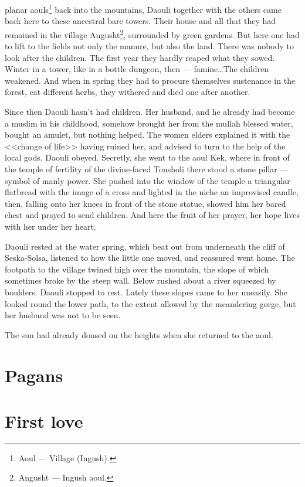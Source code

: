 \documentclass[smalldemyvopaper,11pt,twoside,onecolumn,openright,extrafontsizes]{memoir}
\begin{document}
planar aouls\footnote{Aoul — Village (Ingush).} back into the mountains, Daouli together with the others came back
here to these ancestral bare towers. Their house and all that they had remained
in the village Angusht\footnote{Angusht — Ingush aoul.}, surrounded by green gardens. But here one had to lift
to the fields not only the manure, but also the land. There was nobody to look
after the children. The first year they hardly reaped what they sowed. Winter
in a tower, like in a bottle dungeon, then --- famine\dots The children
weakened. And when in spring they had to procure themselves sustenance in the
forest, eat different herbs, they withered and died one after another.\par
Since then Daouli hasn't had children. Her husband, and he already had become
a muslim in his childhood, somehow brought her from the mullah blessed
water, bought an amulet, but nothing helped. The women elders explained it with
the <<change of life>> having ruined her, and advised to turn to the help of
the local gods. Daouli obeyed. Secretly, she went to the aoul Kek, where in
front of the temple of fertility of the divine-faced Tousholi there stood a
stone pillar --- symbol of manly power. She pushed into the window of the
temple a triangular flatbread with the image of a cross and lighted in the
niche an improvised candle, then, falling onto her knees in front of the stone
statue, showed him her bared chest and prayed to send children. And here the
fruit of her prayer, her hope lives with her under her heart.\par
Daouli rested at the water spring, which beat out from underneath the cliff of
Seska-Solsa, listened to how the little one moved, and reassured went home. The
footpath to the village twined high over the mountain, the slope of which
sometimes broke by the steep wall. Below rushed about a river squeezed by
boulders. Daouli stopped to rest. Lately these slopes came to her uneasily.
She looked round the lower path, to the extent allowed by the meandering gorge,
but her husband was not to be seen.\par
The sun had already doused on the heights when she returned to the aoul. 


\chapter{Pagans}
\chapter{First love}
\end{document}
